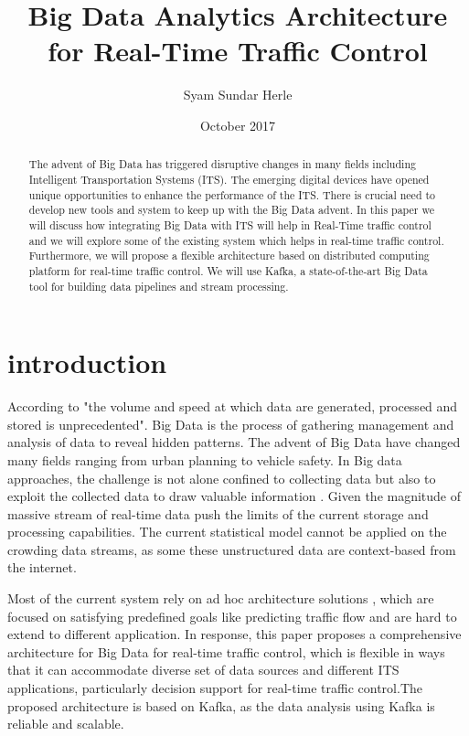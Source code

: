\documentclass[sigconf]{acmart}
\title{Big Data Analytics Architecture for Real-Time Traffic Control}
\author{Syam Sundar Herle}
\affiliation{%
  \institution{School of Informatics and Computing, IN 47408,
  U.S.A.}
  \streetaddress{P.O. Box 1212}
  \city{Bloomington} 
  \state{Indiana} 
  \postcode{47408}
}
\date{October 2017}
\begin{document}
\begin{abstract}
The advent of Big Data has triggered disruptive
changes in many fields including Intelligent Transportation
Systems (ITS). The emerging digital devices have opened unique opportunities  to enhance the performance of the ITS. There is crucial need to develop new tools and system to keep up with the Big Data advent. In this paper we will discuss how integrating Big Data with ITS will help in Real-Time traffic control and we will explore some of the existing system which helps in real-time traffic control. Furthermore, we will propose a flexible architecture based on distributed computing platform for real-time traffic control. We will use Kafka, a state-of-the-art Big
Data tool for building data pipelines and stream processing.
\end{abstract}




\maketitle

\section{introduction}

According to \cite{wwwbigdata} "the volume and speed at which data are generated, processed and stored is unprecedented". Big Data is the process of gathering management and analysis of data to reveal hidden patterns. The advent of Big Data have changed many fields ranging from urban planning to vehicle safety. In Big data approaches, the challenge is not alone confined to collecting data but also to exploit the collected data to draw valuable information . Given the magnitude of massive stream of real-time data push the limits of the current storage and processing capabilities. The current statistical model cannot be applied on the crowding data streams, as some these unstructured data \cite{unstruct} are context-based from the internet.

Most of the current system rely on ad hoc architecture solutions \cite{mapreduce} \cite{infomin}, which are focused on satisfying predefined goals like predicting traffic flow and are hard to extend to different application. In response, this paper proposes a comprehensive architecture for Big Data for real-time traffic control, which is flexible in ways that it can accommodate diverse set of data sources and different ITS applications, particularly decision support for real-time traffic control.The proposed architecture is based on Kafka, as the data analysis using Kafka is reliable and scalable.
\end{document}
